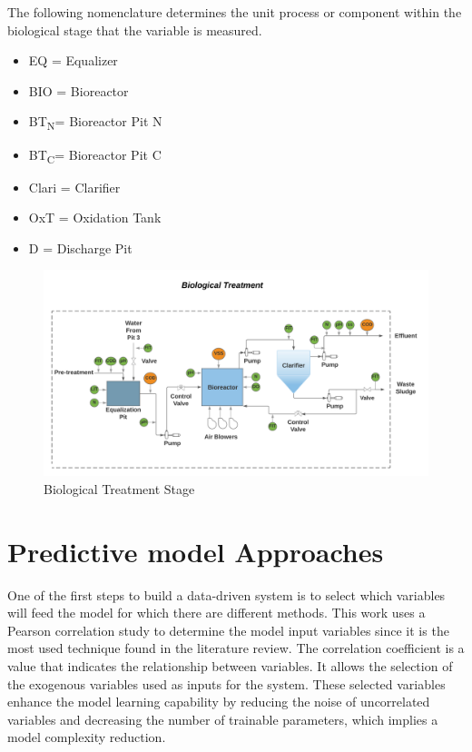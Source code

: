 The following nomenclature determines the unit process or component within the biological stage that the variable is measured.

\begin{itemize}
 \item	EQ = Equalizer
 \item	BIO = Bioreactor
 \item	BT\textsubscript{N}= Bioreactor Pit N
 \item	BT\textsubscript{C}= Bioreactor Pit C
 \item	Clari = Clarifier
 \item	OxT = Oxidation Tank
 \item	D = Discharge Pit
\end{itemize}

\begin{figure}[h]
\centering
\includegraphics[width=\linewidth]{figures/Ch4/Biological-treatment-stage.pdf}
\caption{Biological Treatment Stage}
\label{f:Biological-treatment}
\end{figure}

\section{Predictive model Approaches}
\label{s:model-design}
One of the first steps to build a data-driven system is to select which variables will feed the model for which there are different methods. This work uses a Pearson correlation study to determine the model input variables since it is the most used technique found in the literature review. The correlation coefficient is a value that indicates the relationship between variables. It allows the selection of the exogenous variables used as inputs for the system. These selected variables enhance the model learning capability by reducing the noise of uncorrelated variables and decreasing the number of trainable parameters, which implies a model complexity reduction.

